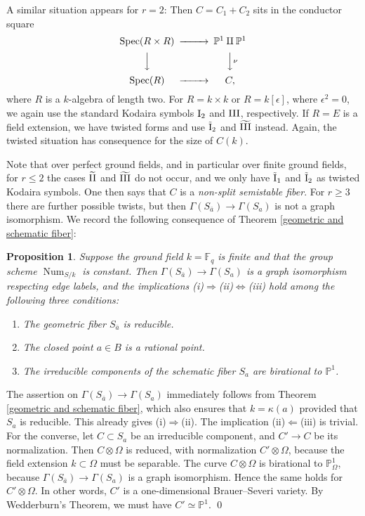 \documentclass[oneside, 12pt]{amsart}
\newcommand\mylabel[1]{\label{#1}\marginpar{\vspace{-1ex}\medskip\medskip\footnotesize \tt #1}}
\renewcommand\mylabel[1]{\label{#1}}
\newtheorem{proposition}[theorem]{Proposition}
\theoremstyle{definition}
\theoremstyle{remark}
\newcommand{\FF}{\mathbb{F}}
\newcommand{\PP}{\mathbb{P}}
\newcommand{\I}{\text{\rm I}}
\newcommand{\II}{\text{\rm II}}
\newcommand{\III}{\text{\rm III}}
\newcommand{\tI}{\text{\rm \~{I}}}
\newcommand{\Num}{\operatorname{Num}}
\newcommand{\ra}{\rightarrow}
\newcommand{\Spec}{\operatorname{Spec}}
\newcommand{\ba}{{\bar{a}}}
\begin{document}
A similar situation appears for $r=2$: Then   $C=C_1+C_2$ sits in the conductor square
$$
\begin{CD}
\Spec(R\times R)	@>>>	\PP^1\amalg\PP^1\\
@VVV		@VV\nu V\\
\Spec(R)	@>>>	C,
\end{CD}
$$
where $R$ is a $k$-algebra of length two. For $R=k\times k$ or $R=k[\epsilon]$, where $\epsilon^2=0$, we again use the standard Kodaira symbols
$\I_2$ and $\III$, respectively. If $R=E$ is a field extension, we have twisted forms and  use $\tI_2$ and $\widetilde{\III}$ instead.
Again, the twisted situation has   consequence for the size of $C(k)$.

Note that over perfect ground fields, and in particular over finite ground fields, for $r\leq 2$ the cases $\widetilde{\II}$ and $\widetilde{\III}$ do not occur,
and   we only have $\tI_1$ and $\tI_2$ as twisted Kodaira symbols. 
One then says that $C$ is a \emph{non-split semistable fiber}.  
For $r\geq 3$ there are further   possible twists, but then  $\Gamma(S_\ba)\ra\Gamma(S_a)$ is not a graph isomorphism.
We   record the following consequence of Theorem \ref{geometric and schematic fiber}:

\begin{proposition}
\mylabel{constant num over finite field}
Suppose the ground field $k=\FF_q$ is finite and
that  the  group scheme $\Num_{S/k}$ is constant.
Then $\Gamma(S_\ba)\ra\Gamma(S_a)$ is a graph isomorphism respecting edge labels, and 
the implications (i)$\Rightarrow$(ii)$\Leftrightarrow$(iii) hold  among the following three conditions:
\begin{enumerate}
\item The geometric fiber $S_\ba$ is reducible.
\item The closed point $a\in B$ is a rational point.
\item The irreducible components of the schematic fiber $S_a$ are birational to $\PP^1$.
\end{enumerate}
\end{proposition}

\proof
The   assertion on $\Gamma(S_\ba)\ra\Gamma(S_a)$ immediately follows from Theorem \ref{geometric and schematic fiber},
which also ensures that   $k=\kappa(a)$ provided that $S_a$ is reducible.
This already gives (i)$\Rightarrow$(ii). The implication (ii)$\Leftarrow$(iii) is trivial.
For the converse,  let $C\subset S_a$ be an irreducible component, and $C'\ra C$ be its normalization.
Then $C\otimes\Omega$ is reduced, with normalization $C'\otimes\Omega$, because the field extension $k\subset\Omega$
must be separable. The curve $C\otimes\Omega$ is  birational to $\PP^1_\Omega$, because 
$\Gamma(S_\ba)\ra\Gamma(S_a)$ is a graph isomorphism. Hence the same holds for $C'\otimes\Omega$.
In other words, $C'$ is a one-dimensional Brauer--Severi variety.  
By Wedderburn's Theorem, we must have $C'\simeq \PP^1$.
\qed
\end{document}
